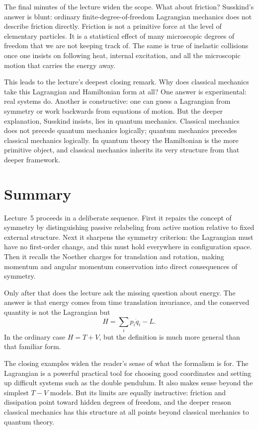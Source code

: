 The final minutes of the lecture widen the scope. What about friction? Susskind's answer is blunt: ordinary finite-degree-of-freedom Lagrangian mechanics does not describe friction directly. Friction is not a primitive force at the level of elementary particles. It is a statistical effect of many microscopic degrees of freedom that we are not keeping track of. The same is true of inelastic collisions once one insists on following heat, internal excitation, and all the microscopic motion that carries the energy away.

This leads to the lecture's deepest closing remark. Why does classical mechanics take this Lagrangian and Hamiltonian form at all? One answer is experimental: real systems do. Another is constructive: one can guess a Lagrangian from symmetry or work backwards from equations of motion. But the deeper explanation, Susskind insists, lies in quantum mechanics. Classical mechanics does not precede quantum mechanics logically; quantum mechanics precedes classical mechanics logically. In quantum theory the Hamiltonian is the more primitive object, and classical mechanics inherits its very structure from that deeper framework.

\section{Summary}

Lecture~5 proceeds in a deliberate sequence. First it repairs the concept of symmetry by distinguishing passive relabeling from active motion relative to fixed external structure. Next it sharpens the symmetry criterion: the Lagrangian must have no first-order change, and this must hold everywhere in configuration space. Then it recalls the Noether charges for translation and rotation, making momentum and angular momentum conservation into direct consequences of symmetry.

Only after that does the lecture ask the missing question about energy. The answer is that energy comes from time translation invariance, and the conserved quantity is not the Lagrangian but
\[
H=\sum_i p_i\dot q_i-L.
\]
In the ordinary case \(H=T+V\), but the definition is much more general than that familiar form.

The closing examples widen the reader's sense of what the formalism is for. The Lagrangian is a powerful practical tool for choosing good coordinates and setting up difficult systems such as the double pendulum. It also makes sense beyond the simplest \(T-V\) models. But its limits are equally instructive: friction and dissipation point toward hidden degrees of freedom, and the deeper reason classical mechanics has this structure at all points beyond classical mechanics to quantum theory.